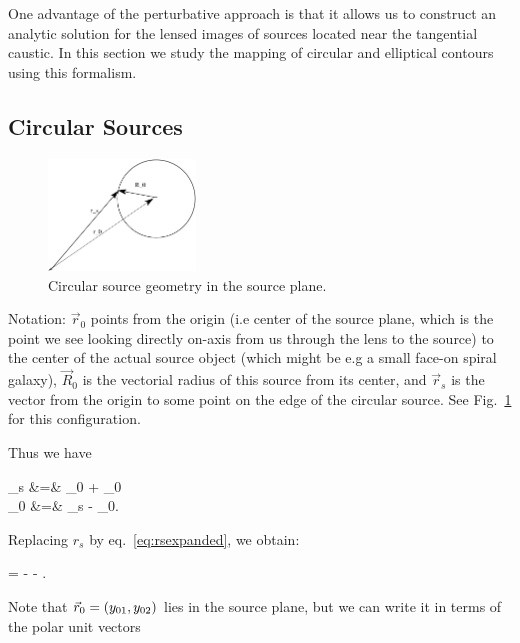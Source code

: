 One advantage of the perturbative approach is that it allows us to
construct an analytic solution for the lensed images of sources
located near the tangential caustic.  In this section we study the
mapping of circular and elliptical contours using this formalism.

\subsection{Circular Sources}

\begin{figure}
  \begin{center}
   \includegraphics[width=0.35\textwidth]{graphics/sourceplane.pdf}
  \end{center}
    \caption{\label{fig:circular_source}Circular source geometry in the source plane.}
\end{figure}

Notation: $ \vec{r}_{0}$ points from the origin (i.e center of the
source plane, which is the point we see looking directly on-axis from
us through the lens to the source) to the center of the actual source
object (which might be e.g a small face-on spiral galaxy), $
\vec{R}_{0}$ is the vectorial radius of this source from its center,
and $ \vec{r}_{s}$ is the vector from the origin to some point on the
edge of the circular source. See Fig.~\ref{fig:circular_source} for this
configuration.



Thus we have

\bea
{}_s &=&  _{0} + _{0} \\
  _{0} &=& _s - _{0}. \nonumber
\eea


Replacing $r_s$ by eq.~\eqref{eq:rsexpanded}, we obtain:

\beq
\label{eq:Rzero}
 =  -   \hat{\theta} - . \;\;\;
\eeq


Note that $\vec{r}_{0} = (y_{01},y_{02})$ lies in the source plane, but we
can write it in terms of the polar unit vectors

